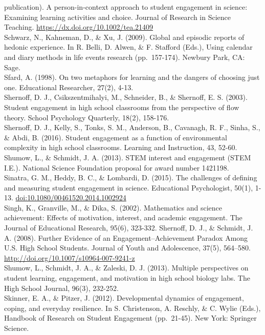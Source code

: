 \documentclass[]{msu-thesis}
\theoremstyle{definition}
\theoremstyle{definition}
\theoremstyle{definition}
\theoremstyle{remark}
\begin{document}
publication). A person-in-context approach to student engagement in
science: Examining learning activities and choice. Journal of Research
in Science Teaching. \url{https://dx.doi.org/10.1002/tea.21409}\\
Schwarz, N., Kahneman, D., \& Xu, J. (2009). Global and episodic reports
of hedonic experience. In R. Belli, D. Alwen, \& F. Stafford (Eds.),
Using calendar and diary methods in life events research (pp.~157-174).
Newbury Park, CA: Sage.\\
Sfard, A. (1998). On two metaphors for learning and the dangers of
choosing just one. Educational Researcher, 27(2), 4-13.\\
Shernoff, D. J., Csikszentmihalyi, M., Schneider, B., \& Shernoff, E. S.
(2003). Student engagement in high school classrooms from the
perspective of flow theory. School Psychology Quarterly, 18(2),
158-176.\\
Shernoff, D. J., Kelly, S., Tonks, S. M., Anderson, B., Cavanagh, R. F.,
Sinha, S., \& Abdi, B. (2016). Student engagement as a function of
environmental complexity in high school classrooms. Learning and
Instruction, 43, 52-60.\\
Shumow, L., \& Schmidt, J. A. (2013). STEM interest and engagement (STEM
I.E.). National Science Foundation proposal for award number 1421198.\\
Sinatra, G. M., Heddy, B. C., \& Lombardi, D. (2015). The challenges of
defining and measuring student engagement in science. Educational
Psychologist, 50(1), 1-13. \url{doi:10.1080/00461520.2014.1002924}\\
Singh, K., Granville, M., \& Dika, S. (2002). Mathematics and science
achievement: Effects of motivation, interest, and academic engagement.
The Journal of Educational Research, 95(6), 323-332. Shernoff, D. J., \&
Schmidt, J. A. (2008). Further Evidence of an Engagement--Achievement
Paradox Among U.S. High School Students. Journal of Youth and
Adolescence, 37(5), 564--580.
\url{http://doi.org/10.1007/s10964-007-9241-z}\\
Shumow, L., Schmidt, J. A., \& Zaleski, D. J. (2013). Multiple
perspectives on student learning, engagement, and motivation in high
school biology labs. The High School Journal, 96(3), 232-252.\\
Skinner, E. A., \& Pitzer, J. (2012). Developmental dynamics of
engagement, coping, and everyday resilience. In S. Christenson, A.
Reschly, \& C. Wylie (Eds.), Handbook of Research on Student Engagement
(pp.~21-45). New York: Springer Science.\\
\end{document}
